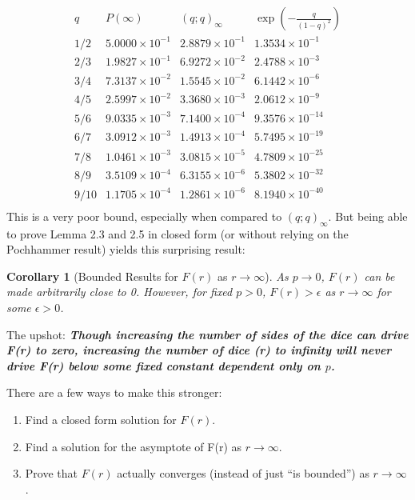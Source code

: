 \documentclass[11pt, oneside]{article} 	%
\newtheorem{corollary}[theorem]{Corollary}
\begin{document}
\[
\begin{array}{c|c|c|c}
q & P(\infty) & (q;q)_\infty & \exp\!\left(-\tfrac{q}{(1-q)^2}\right) \\
\hline
1/2  & 5.0000 \times 10^{-1} & 2.8879 \times 10^{-1} & 1.3534 \times 10^{-1} \\
2/3  & 1.9827 \times 10^{-1} & 6.9272 \times 10^{-2} & 2.4788 \times 10^{-3} \\
3/4  & 7.3137 \times 10^{-2} & 1.5545 \times 10^{-2} & 6.1442 \times 10^{-6} \\
4/5  & 2.5997 \times 10^{-2} & 3.3680 \times 10^{-3} & 2.0612 \times 10^{-9} \\
5/6  & 9.0335 \times 10^{-3} & 7.1400 \times 10^{-4} & 9.3576 \times 10^{-14} \\
6/7  & 3.0912 \times 10^{-3} & 1.4913 \times 10^{-4} & 5.7495 \times 10^{-19} \\
7/8  & 1.0461 \times 10^{-3} & 3.0815 \times 10^{-5} & 4.7809 \times 10^{-25} \\
8/9  & 3.5109 \times 10^{-4} & 6.3155 \times 10^{-6} & 5.3802 \times 10^{-32} \\
9/10 & 1.1705 \times 10^{-4} & 1.2861 \times 10^{-6} & 8.1940 \times 10^{-40} \\
\end{array}
\]
This is a very poor bound, especially when compared to $(q;q)_\infty$.   But being able to prove Lemma 2.3 and 2.5 in closed form (or without relying on the Pochhammer result) yields this surprising result:

\begin{corollary}[Bounded Results for $F(r)$ as $r \rightarrow \infty$] As $p \rightarrow 0$, $F(r)$ can be made arbitrarily close to 0.  However, for fixed $p > 0$, $F(r) > \epsilon$ as $r \rightarrow \infty$ for some $\epsilon > 0$.
\end{corollary}
The upshot: \textit{\textbf{Though increasing the number of sides of the dice can drive F(r) to zero, increasing the number of dice (r) to infinity will never drive F(r) below some fixed constant dependent only on $p$.}}

There are a few ways to make this stronger:
\begin{enumerate}
\item Find a closed form solution for $F(r)$.
\item Find a solution for the asymptote of F(r) as $r \rightarrow \infty$.
\item Prove that $F(r)$ actually converges (instead of just ``is bounded'') as $r \rightarrow \infty$.
\end{enumerate}
\end{document}

